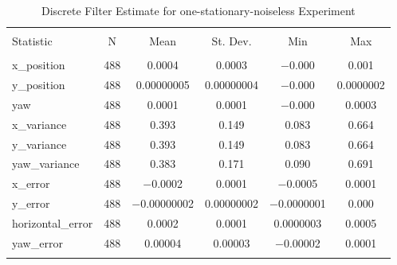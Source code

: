 
\begin{table}[h] \centering 
  \caption{Discrete Filter Estimate for one-stationary-noiseless Experiment} 
  \label{tab:one_stationary_noiseless_discrete_summary} 
\begin{tabular}{@{\extracolsep{5pt}}lccccc} 
\\[-1.8ex]\hline 
\hline \\[-1.8ex] 
Statistic & \multicolumn{1}{c}{N} & \multicolumn{1}{c}{Mean} & \multicolumn{1}{c}{St. Dev.} & \multicolumn{1}{c}{Min} & \multicolumn{1}{c}{Max} \\ 
\hline \\[-1.8ex] 
x\_position & 488 & 0.0004 & 0.0003 & $-$0.000 & 0.001 \\ 
y\_position & 488 & 0.00000005 & 0.00000004 & $-$0.000 & 0.0000002 \\ 
yaw & 488 & 0.0001 & 0.0001 & $-$0.000 & 0.0003 \\ 
x\_variance & 488 & 0.393 & 0.149 & 0.083 & 0.664 \\ 
y\_variance & 488 & 0.393 & 0.149 & 0.083 & 0.664 \\ 
yaw\_variance & 488 & 0.383 & 0.171 & 0.090 & 0.691 \\ 
x\_error & 488 & $-$0.0002 & 0.0001 & $-$0.0005 & 0.0001 \\ 
y\_error & 488 & $-$0.00000002 & 0.00000002 & $-$0.0000001 & 0.000 \\ 
horizontal\_error & 488 & 0.0002 & 0.0001 & 0.0000003 & 0.0005 \\ 
yaw\_error & 488 & 0.00004 & 0.00003 & $-$0.00002 & 0.0001 \\ 
\hline \\[-1.8ex] 
\end{tabular} 
\end{table} 
